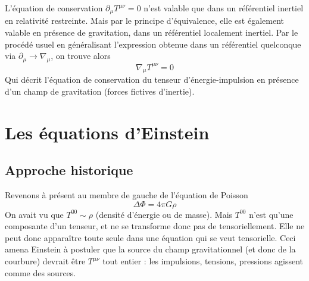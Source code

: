 L'équation de conservation $\partial_{\mu}T^{\mu \nu} = 0$ n'est valable que dans un référentiel inertiel en relativité restreinte. Mais par le principe d'équivalence, elle est également valable en présence de gravitation, dans un référentiel localement inertiel. Par le procédé usuel en généralisant l'expression obtenue dans un référentiel quelconque via $\partial_{\mu} \to \nabla_{\mu}$, on trouve alors
\begin{equation}
    \nabla_{\mu}T^{\mu \nu} = 0
\end{equation}
Qui décrit l'équation de conservation du tenseur d'énergie-impulsion en présence d'un champ de gravitation (forces fictives d'inertie).
\section{Les équations d'Einstein}
\subsection{Approche historique}
Revenons à présent au membre de gauche de l'équation de Poisson
\begin{equation}
    \Delta\Phi = 4\pi G\rho
\end{equation}
On avait vu que $T^{00} \sim \rho$ (densité d'énergie ou de masse). Mais $T^{00}$ n'est qu'une composante d'un tenseur, et ne se transforme donc pas de tensoriellement. Elle ne peut donc apparaître toute seule dans une équation qui se veut tensorielle. Ceci amena Einstein à postuler que la source du champ gravitationnel (et donc de la courbure) devrait être $T^{\mu \nu}$ tout entier : les impulsions, tensions, pressions agissent comme des sources.

